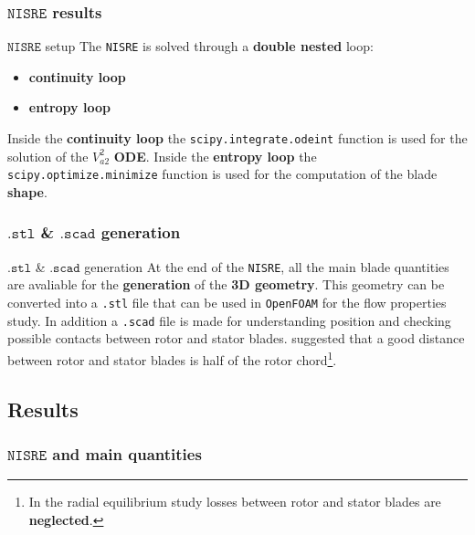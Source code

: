 \subsubsection{$\mathtt{NISRE}$ results}
	\begin{frame}[fragile]{$\mathtt{NISRE}$ setup}
		The \verb|NISRE| is solved through a \textbf{double nested} loop:
		\begin{itemize}
			\item \textbf{continuity loop}
			\item \textbf{entropy loop}
		\end{itemize}
		Inside the \textbf{continuity loop} the \verb|scipy.integrate.odeint| function is used for the solution of the $V_{a2}^2$ \textbf{ODE}.
		\newline
		\newline
		Inside the \textbf{entropy loop} the \verb|scipy.optimize.minimize| function is used for the computation of the blade \textbf{shape}.
	\end{frame}

\subsubsection{$\mathtt{.stl}$ \& $\mathtt{.scad}$ generation}
	\begin{frame}[fragile]{$\mathtt{.stl}$ \& $\mathtt{.scad}$ generation}
		At the end of the \verb|NISRE|, all the main blade quantities are avaliable for the \textbf{generation} of the \textbf{3D geometry}. This geometry can be converted into a \verb|.stl| file that can be used in \verb|OpenFOAM| for the flow properties study. In addition a \verb|.scad| file is made for understanding position and checking possible contacts between rotor and stator blades.	
		\newline
		\newline 
		\cite{baskharone2006principles} suggested that a good distance between rotor and stator blades is half of the rotor chord\footnote{In the radial equilibrium study losses between rotor \newline and stator blades are \textbf{neglected}.}.
	\end{frame}

\subsection{Results}
	\subsubsection{$\mathtt{NISRE}$ and main quantities}

